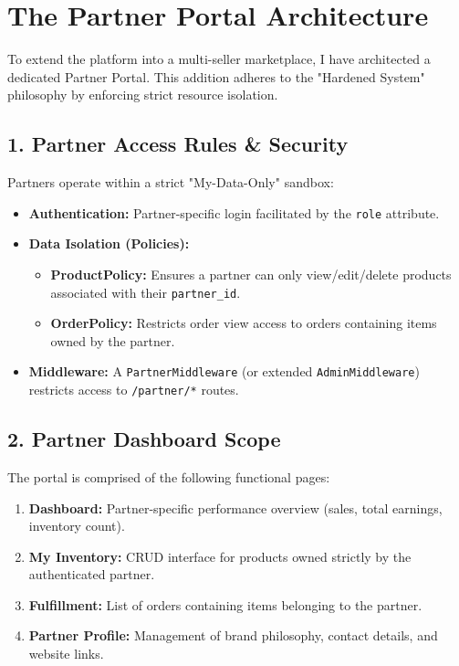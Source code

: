 \documentclass[12pt,a4paper]{article}
\begin{document}
\section{The Partner Portal Architecture}

To extend the platform into a multi-seller marketplace, I have architected a dedicated Partner Portal. This addition adheres to the "Hardened System" philosophy by enforcing strict resource isolation.

\subsection{1. Partner Access Rules \& Security}
Partners operate within a strict "My-Data-Only" sandbox:
\begin{itemize}
    \item \textbf{Authentication:} Partner-specific login facilitated by the \texttt{role} attribute.
    \item \textbf{Data Isolation (Policies):}
    \begin{itemize}
        \item \textbf{ProductPolicy:} Ensures a partner can only view/edit/delete products associated with their \texttt{partner\_id}.
        \item \textbf{OrderPolicy:} Restricts order view access to orders containing items owned by the partner.
    \end{itemize}
    \item \textbf{Middleware:} A \texttt{PartnerMiddleware} (or extended \texttt{AdminMiddleware}) restricts access to \texttt{/partner/*} routes.
\end{itemize}

\subsection{2. Partner Dashboard Scope}
The portal is comprised of the following functional pages:
\begin{enumerate}
    \item \textbf{Dashboard:} Partner-specific performance overview (sales, total earnings, inventory count).
    \item \textbf{My Inventory:} CRUD interface for products owned strictly by the authenticated partner.
    \item \textbf{Fulfillment:} List of orders containing items belonging to the partner.
    \item \textbf{Partner Profile:} Management of brand philosophy, contact details, and website links.
\end{enumerate}
\end{document}
